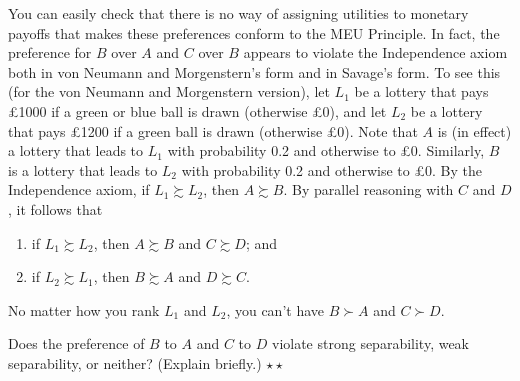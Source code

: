 You can easily check that there is no way of assigning utilities to
monetary payoffs that makes these preferences conform to the MEU
Principle. In fact, the preference for $B$ over $A$ and $C$ over $B$
appears to violate the Independence axiom both in von Neumann and
Morgenstern's form and in Savage's form. To see this (for the von
Neumann and Morgenstern version), let $L_1$ be a lottery that pays
£1000 if a green or blue ball is drawn (otherwise £0), and let $L_2$
be a lottery that pays £1200 if a green ball is drawn (otherwise
£0). Note that $A$ is (in effect) a lottery that leads to $L_1$ with
probability 0.2 and otherwise to £0. Similarly, $B$ is a lottery that
leads to $L_2$ with probability 0.2 and otherwise to £0. By the
Independence axiom, if $L_1 \succsim L_2$, then $A \succsim B$. By
parallel reasoning with $C$ and $D$, it follows that
\begin{enumerate}
  \itemsep0em 
\item if $L_1 \succsim L_2$, then $A \succsim B$ and $C \succsim D$; and
\item if $L_2 \succsim L_1$, then $B \succsim A$ and $D \succsim C$.
\end{enumerate}
No matter how you rank $L_1$ and $L_2$, you can't have $B \succ A$ and $C \succ D$.

\begin{exercise}
  Does the preference of $B$ to $A$ and $C$ to $D$ violate strong
  separability, weak separability, or neither? (Explain briefly.)
  $\star\star$
\end{exercise}


